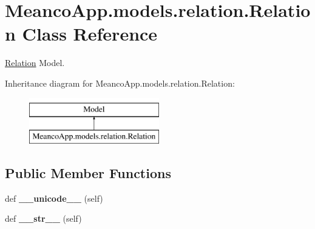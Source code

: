 \hypertarget{class_meanco_app_1_1models_1_1relation_1_1_relation}{}\section{Meanco\+App.\+models.\+relation.\+Relation Class Reference}
\label{class_meanco_app_1_1models_1_1relation_1_1_relation}


\hyperlink{class_meanco_app_1_1models_1_1relation_1_1_relation}{Relation} Model.  


Inheritance diagram for Meanco\+App.\+models.\+relation.\+Relation\+:\begin{figure}[H]
\begin{center}
\leavevmode
\includegraphics[height=2.000000cm]{class_meanco_app_1_1models_1_1relation_1_1_relation}
\end{center}
\end{figure}
\subsection*{Public Member Functions}
\begin{DoxyCompactItemize}
\item 
\hypertarget{class_meanco_app_1_1models_1_1relation_1_1_relation_a68673129d5493e71fa65804f6bcc2adc}{}\label{class_meanco_app_1_1models_1_1relation_1_1_relation_a68673129d5493e71fa65804f6bcc2adc} 
def {\bfseries \+\_\+\+\_\+unicode\+\_\+\+\_\+} (self)
\item 
\hypertarget{class_meanco_app_1_1models_1_1relation_1_1_relation_a5c4e28bf76a4b4a2ff5c3194df38ca77}{}\label{class_meanco_app_1_1models_1_1relation_1_1_relation_a5c4e28bf76a4b4a2ff5c3194df38ca77} 
def {\bfseries \+\_\+\+\_\+str\+\_\+\+\_\+} (self)
\end{DoxyCompactItemize}
